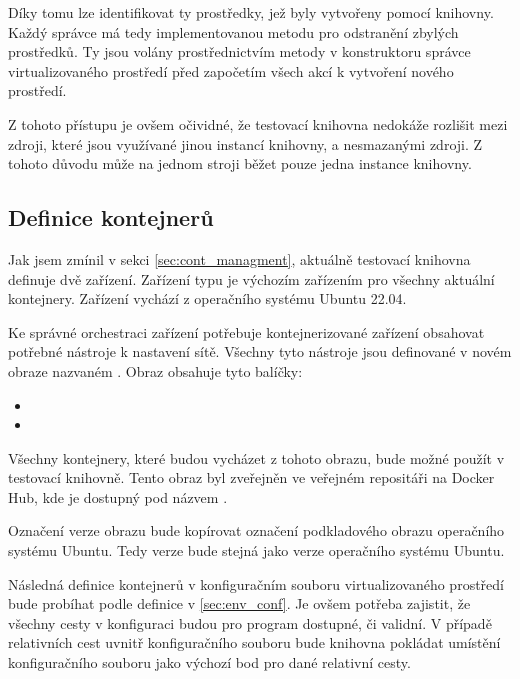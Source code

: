 Díky tomu lze identifikovat ty prostředky, jež byly vytvořeny pomocí knihovny. Každý správce má tedy implementovanou metodu pro odstranění zbylých prostředků. Ty jsou volány prostřednictvím metody  v konstruktoru správce virtualizovaného prostředí před započetím všech akcí k vytvoření nového prostředí.

Z tohoto přístupu je ovšem očividné, že testovací knihovna nedokáže rozlišit mezi zdroji, které jsou využívané jinou instancí knihovny, a nesmazanými zdroji. Z tohoto důvodu může na jednom stroji běžet pouze jedna instance knihovny.

\subsection{Definice kontejnerů}

Jak jsem zmínil v sekci \ref{sec:cont_managment}, aktuálně testovací knihovna definuje dvě zařízení. Zařízení typu  je výchozím zařízením pro všechny aktuální kontejnery. Zařízení vychází z operačního systému Ubuntu 22.04. 

Ke správné orchestraci zařízení potřebuje kontejnerizované zařízení obsahovat potřebné nástroje k nastavení sítě. Všechny tyto nástroje jsou definované v novém obraze nazvaném . Obraz obsahuje tyto balíčky:

\begin{itemize}
    \item {}
    \item {}
\end{itemize}

Všechny kontejnery, které budou vycházet z tohoto obrazu, bude možné použít v testovací knihovně. Tento obraz byl zveřejněn ve veřejném repositáři na Docker Hub\cite{docker_hub}, kde je dostupný pod názvem .

Označení verze obrazu bude kopírovat označení podkladového obrazu operačního systému Ubuntu. Tedy verze bude stejná jako verze operačního systému Ubuntu. 

Následná definice kontejnerů v konfiguračním souboru virtualizovaného prostředí bude probíhat podle definice v \ref{sec:env_conf}. Je ovšem potřeba zajistit, že všechny cesty v konfiguraci budou pro program dostupné, či validní. V případě relativních cest uvnitř konfiguračního souboru bude knihovna pokládat umístění konfiguračního souboru jako výchozí bod pro dané relativní cesty.

